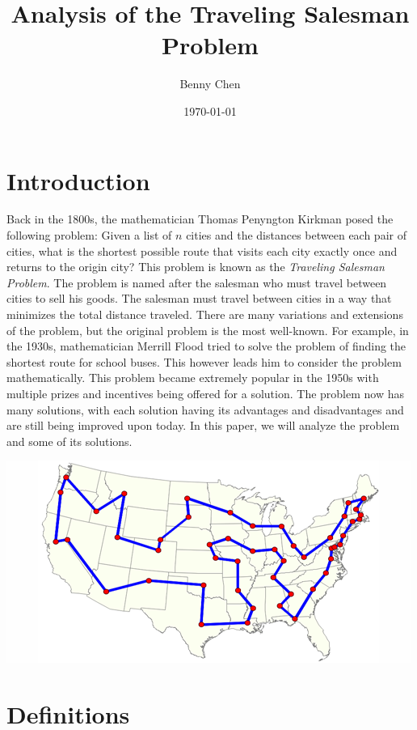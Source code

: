 \documentclass[12pt]{article}
\title{Analysis of the Traveling Salesman Problem}
\author{Benny Chen}
\date{\today}
\begin{document}
\maketitle

\section{Introduction}
Back in the 1800s, the mathematician Thomas Penyngton Kirkman posed the following problem: Given a list of $n$ cities and the distances between each pair of cities, what is the shortest possible route that visits each city exactly once and returns to the origin city? This problem is known as the \textit{Traveling Salesman Problem}. The problem is named after the salesman who must travel between cities to sell his goods. The salesman must travel between cities in a way that minimizes the total distance traveled. There are many variations and extensions of the problem, but the original problem is the most well-known. For example, in the 1930s, mathematician Merrill Flood tried to solve the problem of finding the shortest route for school buses. This however leads him to consider the problem 
mathematically. This problem became extremely popular in the 1950s with multiple prizes and incentives being offered for a solution. The problem now has many solutions, with each solution having its advantages and disadvantages and are still being improved upon today. In this paper, we will analyze the problem and some of its solutions.

\begin{center}
    \includegraphics[scale = .5]{images/graph2.png}
\end{center}

\section{Definitions}
\end{document}
